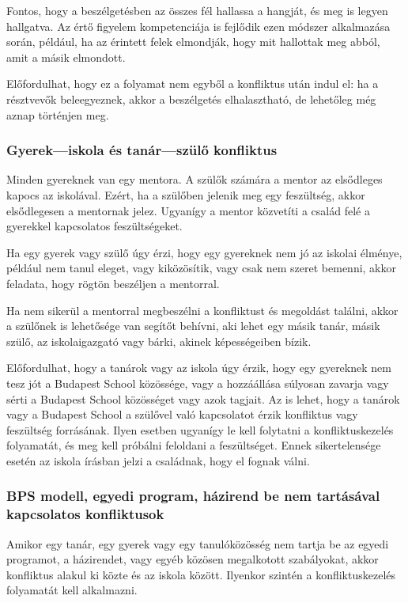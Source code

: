 Fontos, hogy a beszélgetésben az összes fél hallassa a hangját, és meg
is legyen hallgatva. Az értő figyelem kompetenciája is fejlődik ezen
módszer alkalmazása során, például, ha az érintett felek elmondják, hogy
mit hallottak meg abból, amit a másik elmondott.

Előfordulhat, hogy ez a folyamat nem egyből a konfliktus után indul el:
ha a résztvevők beleegyeznek, akkor a beszélgetés elhalasztható, de
lehetőleg még aznap történjen meg.

\hypertarget{gyerek-iskola-tanar-szulo-konfliktus}{%
\subsubsection{Gyerek---iskola és tanár---szülő
konfliktus}\label{gyerek-iskola-tanar-szulo-konfliktus}}

Minden gyereknek van egy mentora. A szülők számára a mentor az
elsődleges kapocs az iskolával. Ezért, ha a szülőben jelenik meg egy
feszültség, akkor elsődlegesen a mentornak jelez. Ugyanígy a mentor
közvetíti a család felé a gyerekkel kapcsolatos feszültségeket.

Ha egy gyerek vagy szülő úgy érzi, hogy egy gyereknek nem jó az iskolai
élménye, például nem tanul eleget, vagy kiközösítik, vagy csak nem
szeret bemenni, akkor feladata, hogy rögtön beszéljen a mentorral.

Ha nem sikerül a mentorral megbeszélni a konfliktust és megoldást
találni, akkor a szülőnek is lehetősége van segítőt behívni, aki lehet
egy másik tanár, másik szülő, az iskolaigazgató vagy bárki, akinek
képességeiben bízik.

Előfordulhat, hogy a tanárok vagy az iskola úgy érzik, hogy egy
gyereknek nem tesz jót a Budapest School közössége, vagy a hozzáállása
súlyosan zavarja vagy sérti a Budapest School közösséget vagy azok
tagjait. Az is lehet, hogy a tanárok vagy a Budapest School a szülővel
való kapcsolatot érzik konfliktus vagy feszültség forrásának. Ilyen
esetben ugyanígy le kell folytatni a konfliktuskezelés folyamatát, és
meg kell próbálni feloldani a feszültséget. Ennek sikertelensége esetén az
iskola írásban jelzi a családnak, hogy el fognak válni.

\hypertarget{bps-modell-egyedi-program-hazirend-be-nem-tartasaval-kapcsolatos-konfliktusok}{%
\subsubsection{BPS modell, egyedi program, házirend be nem tartásával
kapcsolatos
konfliktusok}\label{bps-modell-egyedi-program-hazirend-be-nem-tartasaval-kapcsolatos-konfliktusok}}

Amikor egy tanár, egy gyerek vagy egy tanulóközösség nem tartja be az
egyedi programot, a házirendet, vagy egyéb közösen megalkotott
szabályokat, akkor konfliktus alakul ki közte és az iskola között.
Ilyenkor szintén a konfliktuskezelés folyamatát kell alkalmazni.
